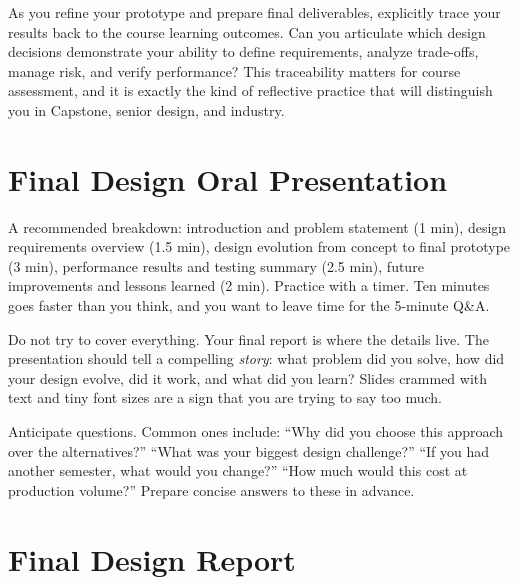 \documentclass[11pt,letterpaper]{article}
\begin{document}
\begin{protip}
As you refine your prototype and prepare final deliverables, explicitly trace your results back to the course learning outcomes. Can you articulate which design decisions demonstrate your ability to define requirements, analyze trade-offs, manage risk, and verify performance? This traceability matters for course assessment, and it is exactly the kind of reflective practice that will distinguish you in Capstone, senior design, and industry.
\end{protip}

\section{Final Design Oral Presentation}

\begin{faqbox}
A recommended breakdown: introduction and problem statement (1 min), design requirements overview (1.5 min), design evolution from concept to final prototype (3 min), performance results and testing summary (2.5 min), future improvements and lessons learned (2 min). Practice with a timer. Ten minutes goes faster than you think, and you want to leave time for the 5-minute Q\&A.
\end{faqbox}

\begin{warnbox}
Do not try to cover everything. Your final report is where the details live. The presentation should tell a compelling \textit{story}: what problem did you solve, how did your design evolve, did it work, and what did you learn? Slides crammed with text and tiny font sizes are a sign that you are trying to say too much.
\end{warnbox}

\begin{protip}
Anticipate questions. Common ones include: ``Why did you choose this approach over the alternatives?'' ``What was your biggest design challenge?'' ``If you had another semester, what would you change?'' ``How much would this cost at production volume?'' Prepare concise answers to these in advance.
\end{protip}

\section{Final Design Report}
\end{document}
